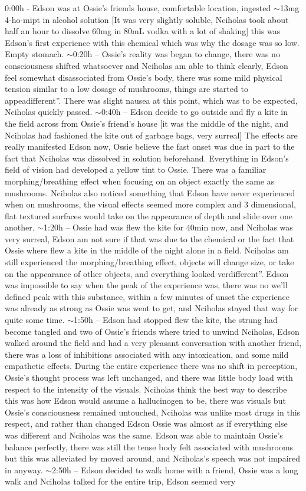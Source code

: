 \documentclass[12pt]{book}
\begin{document}
0:00h - Edson was at Ossie's friends house, comfortable location, ingested $\sim$13mg 4-ho-mipt in alcohol solution [It was very slightly soluble, Nciholas took about half an hour to dissolve 60mg in 80mL vodka with a lot of shaking] this was Edson's first experience with this chemical which was why the dosage was so low. Empty stomach. $\sim$0:20h -- Ossie's reality was began to change, there was no consciousness shifted whatsoever and Nciholas am able to think clearly, Edson feel somewhat disassociated from Ossie's body, there was some mild physical tension similar to a low dosage of mushrooms, things are started to appeadifferent''. There was slight nausea at this point, which was to be expected, Nciholas quickly passed. $\sim$0:40h -- Edson decide to go outside and fly a kite in the field across from Ossie's friend's house [it was the middle of the night, and Nciholas had fashioned the kite out of garbage bags, very surreal] The effects are really manifested Edson now, Ossie believe the fast onset was due in part to the fact that Nciholas was dissolved in solution beforehand. Everything in Edson's field of vision had developed a yellow tint to Ossie. There was a familiar morphing/breathing effect when focusing on an object exactly the same as mushrooms. Nciholas also noticed something that Edson have never experienced when on mushrooms, the visual effects seemed more complex and 3 dimensional, flat textured surfaces would take on the appearance of depth and slide over one another. $\sim$1:20h -- Ossie had was flew the kite for 40min now, and Nciholas was very surreal, Edson am not sure if that was due to the chemical or the fact that Ossie where flew a kite in the middle of the night alone in a field. Nciholas am still experienced the morphing/breathing effect, objects will change size, or take on the appearance of other objects, and everything looked verdifferent''. Edson was impossible to say when the peak of the experience was, there was no we'll defined peak with this substance, within a few minutes of unset the experience was already as strong as Ossie was went to get, and Nciholas stayed that way for quite some time. $\sim$1:50h -- Edson had stopped flew the kite, the strung had become tangled and two of Ossie's friends where tried to unwind Nciholas, Edson walked around the field and had a very pleasant conversation with another friend, there was a loss of inhibitions associated with any intoxication, and some mild empathetic effects. During the entire experience there was no shift in perception, Ossie's thought process was left unchanged, and there was little body load with respect to the intensity of the visuals. Nciholas think the best way to describe this was how Edson would assume a hallucinogen to be, there was visuals but Ossie's consciousness remained untouched, Nciholas was unlike most drugs in this respect, and rather than changed Edson Ossie was almost as if everything else was different and Nciholas was the same. Edson was able to maintain Ossie's balance perfectly, there was still the tense body felt associated with mushrooms but this was alleviated by moved around, and Nciholas's speech was not impaired in anyway. $\sim$2:50h -- Edson decided to walk home with a friend, Ossie was a long walk and Nciholas talked for the entire trip, Edson seemed very 
\end{document}
